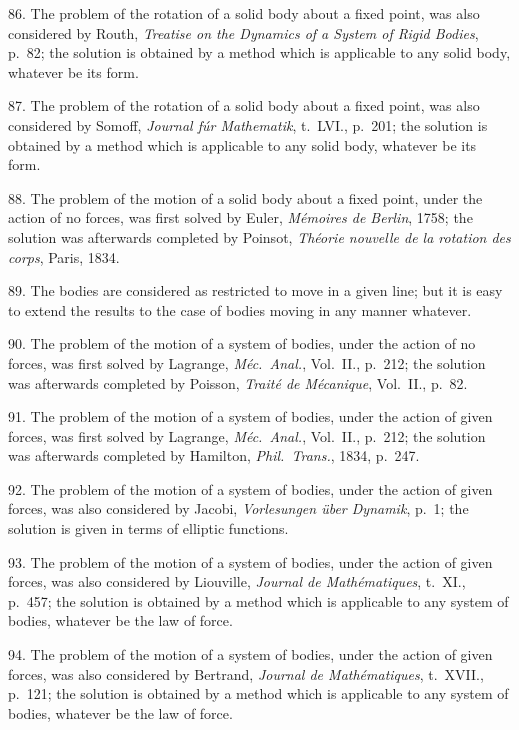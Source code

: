 \documentclass[11pt,a4paper]{article}
\begin{document}
86. The problem of the rotation of a solid body about a fixed point, was also considered by Routh, \textit{Treatise on the Dynamics of a System of Rigid Bodies}, p.~82; the solution is obtained by a method which is applicable to any solid body, whatever be its form.

87. The problem of the rotation of a solid body about a fixed point, was also considered by Somoff, \textit{Journal f\'ur Mathematik}, t.~LVI., p.~201; the solution is obtained by a method which is applicable to any solid body, whatever be its form.

88. The problem of the motion of a solid body about a fixed point, under the action of no forces, was first solved by Euler, \textit{M\'emoires de Berlin}, 1758; the solution was afterwards completed by Poinsot, \textit{Th\'eorie nouvelle de la rotation des corps}, Paris, 1834.

89. The bodies are considered as restricted to move in a given line; but it is easy to extend the results to the case of bodies moving in any manner whatever.

90. The problem of the motion of a system of bodies, under the action of no forces, was first solved by Lagrange, \textit{M\'ec.\ Anal.}, Vol.~II., p.~212; the solution was afterwards completed by Poisson, \textit{Trait\'e de M\'ecanique}, Vol.~II., p.~82.

\newpage
\setcounter{page}{545}

91. The problem of the motion of a system of bodies, under the action of given forces, was first solved by Lagrange, \textit{M\'ec.\ Anal.}, Vol.~II., p.~212; the solution was afterwards completed by Hamilton, \textit{Phil.\ Trans.}, 1834, p.~247.

92. The problem of the motion of a system of bodies, under the action of given forces, was also considered by Jacobi, \textit{Vorlesungen \"uber Dynamik}, p.~1; the solution is given in terms of elliptic functions.

93. The problem of the motion of a system of bodies, under the action of given forces, was also considered by Liouville, \textit{Journal de Math\'ematiques}, t.~XI., p.~457; the solution is obtained by a method which is applicable to any system of bodies, whatever be the law of force.

94. The problem of the motion of a system of bodies, under the action of given forces, was also considered by Bertrand, \textit{Journal de Math\'ematiques}, t.~XVII., p.~121; the solution is obtained by a method which is applicable to any system of bodies, whatever be the law of force.
\end{document}
